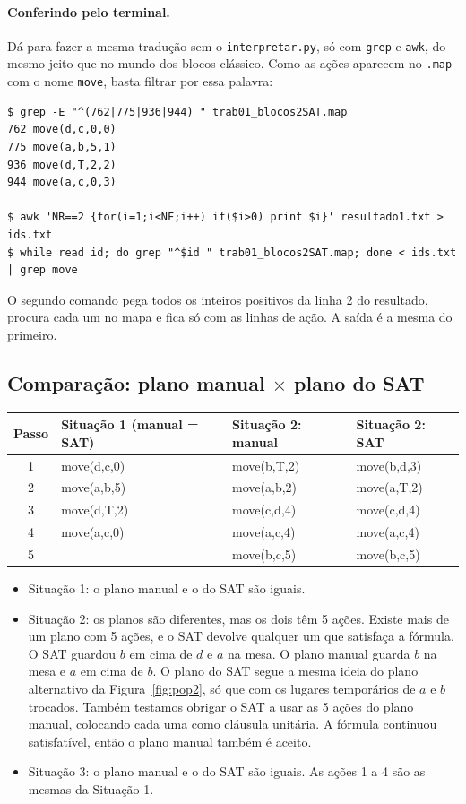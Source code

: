 \documentclass[11pt,a4paper]{article}
\begin{document}
\paragraph{Conferindo pelo terminal.} Dá para fazer a mesma tradução sem o
\texttt{interpretar.py}, só com \texttt{grep} e \texttt{awk}, do mesmo jeito que no
mundo dos blocos clássico. Como as ações aparecem no \texttt{.map} com o nome
\texttt{move}, basta filtrar por essa palavra:
\begin{lstlisting}
$ grep -E "^(762|775|936|944) " trab01_blocos2SAT.map
762 move(d,c,0,0)
775 move(a,b,5,1)
936 move(d,T,2,2)
944 move(a,c,0,3)

$ awk 'NR==2 {for(i=1;i<NF;i++) if($i>0) print $i}' resultado1.txt > ids.txt
$ while read id; do grep "^$id " trab01_blocos2SAT.map; done < ids.txt | grep move
\end{lstlisting}
O segundo comando pega todos os inteiros positivos da linha 2 do resultado, procura
cada um no mapa e fica só com as linhas de ação. A saída é a mesma do primeiro.

\subsection{Comparação: plano manual \texorpdfstring{$\times$}{x} plano do SAT}
\begin{center}\small
\begin{tabular}{@{}clll@{}}
\toprule
Passo & Situação 1 (manual = SAT) & Situação 2: manual & Situação 2: SAT\\
\midrule
1 & move(d,c,0) & move(b,T,2) & move(b,d,3)\\
2 & move(a,b,5) & move(a,b,2) & move(a,T,2)\\
3 & move(d,T,2) & move(c,d,4) & move(c,d,4)\\
4 & move(a,c,0) & move(a,c,4) & move(a,c,4)\\
5 & & move(b,c,5) & move(b,c,5)\\
\bottomrule
\end{tabular}
\end{center}
\begin{itemize}
  \item Situação 1: o plano manual e o do SAT são iguais.
  \item Situação 2: os planos são diferentes, mas os dois têm 5 ações. Existe mais
        de um plano com 5 ações, e o SAT devolve qualquer um que satisfaça a
        fórmula. O SAT guardou $b$ em
        cima de $d$ e $a$ na mesa. O plano manual guarda $b$ na mesa e $a$ em cima
        de $b$. O plano do SAT segue a mesma ideia do plano alternativo da
        Figura~\ref{fig:pop2}, só que com os lugares temporários de $a$ e $b$
        trocados. Também testamos obrigar o SAT a usar as 5 ações do plano manual,
        colocando cada uma como cláusula unitária. A fórmula continuou satisfatível,
        então o plano manual também é aceito.
  \item Situação 3: o plano manual e o do SAT são iguais. As ações 1 a 4 são as mesmas da Situação 1.
\end{itemize}
\end{document}
